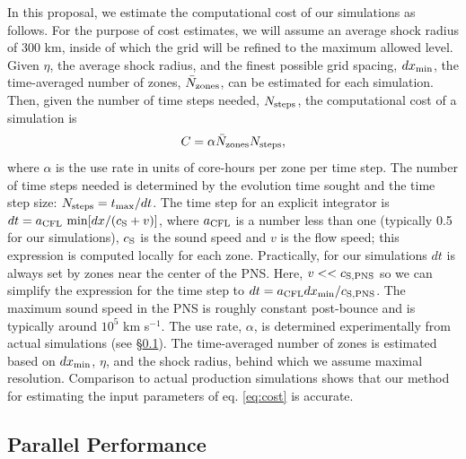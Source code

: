 In this proposal, we estimate the computational cost of our
simulations as follows.  For the purpose of cost estimates, we will
assume an average shock radius of 300 km, inside of which the grid
will be refined to the maximum allowed level.   Given $\eta$, the
average shock radius, and the finest possible grid spacing, $d
x_{\rm min}$, the time-averaged number of zones, $\bar N_{\rm zones}$,
can be estimated for each simulation.  Then, given the number of time
steps needed, $N_{\rm steps}$, the computational cost of a simulation
is
\begin{equation}
C = \alpha   \bar N_{\rm zones} N_{\rm steps},
\label{eq:cost}
\end{equation}
where $\alpha$ is the use rate in units of core-hours per zone per
time step.
The number of time steps needed is determined by the
evolution time sought and the time step size: $N_{\rm steps} = t_{\rm
  max} / d t$.
The time step for an explicit integrator is $d t = a_{\rm CFL}\ {\rm min}[d x / (c_{\rm S} + v)]$, where $a_{\rm CFL}$ is a number less than one (typically 0.5 for our simulations), $c_{\rm S}$ is the sound speed and $v$ is the flow speed; this expression is computed locally for each zone.
Practically, for our simulations $d t$ is always set by zones near the center of the PNS.  Here, $v << c_{\rm S,PNS}$ so we can simplify the expression for the time step to $d t = a_{\rm CFL} d x_{\rm
  min} / c_{\rm S,PNS}$. The maximum sound speed in the PNS is roughly
constant post-bounce and is typically around $10^5$ km s$^{-1}$.
The use rate, $\alpha$, is determined experimentally from actual simulations (see \S\ref{sec:performance}).  The time-averaged number of zones is estimated based on $d x_{\rm min}$, $\eta$, and the shock radius, behind which we assume maximal resolution.  Comparison to actual production simulations shows that our method for estimating the input parameters of eq. \ref{eq:cost} is accurate.




\subsection{Parallel Performance}
\label{sec:performance}


